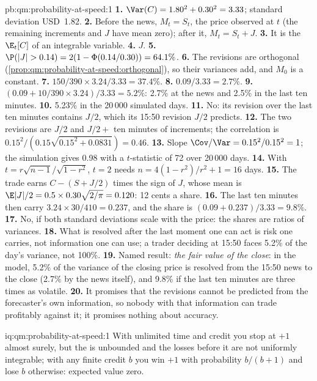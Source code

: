 \begin{solution}{pb:qm:probability-at-speed:1}
\textbf{1.} $\Var(C) = 1.80^2 + 0.30^2 = 3.33$; standard deviation USD~1.82.
\textbf{2.} Before the news, $M_t = S_t$, the price observed at $t$ (the remaining increments
and $J$ have mean zero); after it, $M_t = S_t + J$.
\textbf{3.} It is the  $\E_t[C]$ of an integrable variable.
\textbf{4.} $J$.
\textbf{5.} $\P(|J| > 0.14) = 2(1 - \Phi(0.14/0.30)) = 64.1\%$.
\textbf{6.} The revisions are orthogonal (\cref{prop:qm:probability-at-speed:orthogonal}), so
their variances add, and $M_0$ is a constant.
\textbf{7.} $150/390 \times 3.24/3.33 = 37.4\%$.
\textbf{8.} $0.09/3.33 = 2.7\%$.
\textbf{9.} $(0.09 + 10/390 \times 3.24)/3.33 = 5.2\%$: 2.7\% at the news and 2.5\% in the last
ten minutes.
\textbf{10.} 5.23\% in the 20\,000 simulated days.
\textbf{11.} No: its revision over the last ten minutes contains $J/2$, which its 15:50
revision $J/2$ predicts.
\textbf{12.} The two revisions are $J/2$ and $J/2 + $ ten minutes of increments; the
correlation is $0.15^2/(0.15\sqrt{0.15^2 + 0.0831}) = 0.46$.
\textbf{13.} Slope $\Cov/\Var = 0.15^2/0.15^2 = 1$; the simulation gives 0.98 with a
$t$-statistic of 72 over 20\,000 days.
\textbf{14.} With $t = r\sqrt{n - 1}/\sqrt{1 - r^2}$, $t = 2$ needs $n = 4(1 - r^2)/r^2 + 1 =
16$ days.
\textbf{15.} The trade earns $C - (S + J/2)$ times the sign of $J$, whose mean is $\E|J|/2 =
0.5 \times 0.30\sqrt{2/\pi} = 0.120$: 12 cents a share.
\textbf{16.} The last ten minutes then carry $3.24 \times 30/410 = 0.237$, and the share is
$(0.09 + 0.237)/3.33 = 9.8\%$.
\textbf{17.} No, if both standard deviations scale with the price: the shares are ratios of
variances.
\textbf{18.} What is resolved after the last moment one can act is risk one carries, not
information one can use; a trader deciding at 15:50 faces 5.2\% of the day's variance,
not 100\%.
\textbf{19.} Named result: \emph{the fair value of the close}: in the model, 5.2\% of the
variance of the closing price is resolved from the 15:50 news to the close (2.7\% by the news
itself), and 9.8\% if the last ten minutes are three times as volatile.
\textbf{20.} It promises that the revisions cannot be predicted from the forecaster's own
information, so nobody with that information can trade profitably against it; it promises
nothing about accuracy.
\end{solution}

\begin{solution}{iq:qm:probability-at-speed:1}
With unlimited time and credit you stop at $+1$ almost surely, but the  is
unbounded and the losses before it are not uniformly integrable; with any finite credit $b$
you win $+1$ with probability $b/(b+1)$ and lose $b$ otherwise: expected value zero.
\end{solution}

